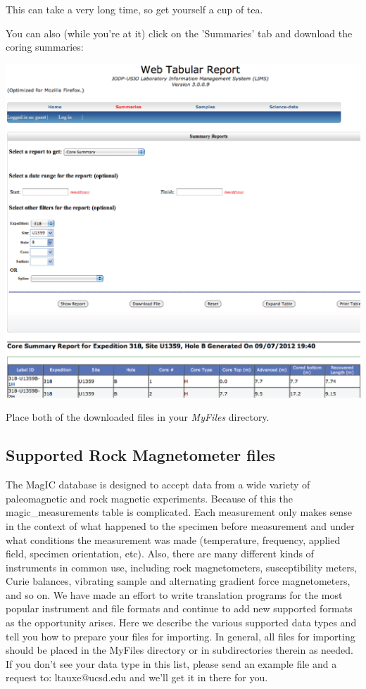 \documentclass[11pt]{book}
\begin{document}
{This can take a very long time, so get yourself a cup of tea.

You can also (while you're at it) click on the 'Summaries' tab and download the coring summaries:

\includegraphics[width=15cm]{EPSfiles/WebTabular_core.eps}

Place both of the downloaded files in your {\it MyFiles} directory.



\subsection{Supported Rock Magnetometer files}

The MagIC database is designed to accept data from a wide variety of paleomagnetic and rock magnetic experiments. Because of this the magic\_measurements table is complicated. Each measurement only makes sense in the context of what happened to the specimen before measurement and under what conditions the measurement was made (temperature, frequency, applied field, specimen orientation, etc). Also, there are many different kinds of instruments in common use, including rock magnetometers, susceptibility meters, Curie balances, vibrating sample and alternating gradient force magnetometers, and so on. We have made an effort to write translation programs for the most popular instrument and file formats and continue to add new supported formats as the opportunity arises. Here we describe the various supported data types and tell you how to prepare your files for importing. In general, all files for importing should be placed in the MyFiles directory or in subdirectories therein as needed.  If you don't see your data type in this list, please send an example file and a request to:  ltauxe@ucsd.edu and we'll get it in there for you.


}
\end{document}
